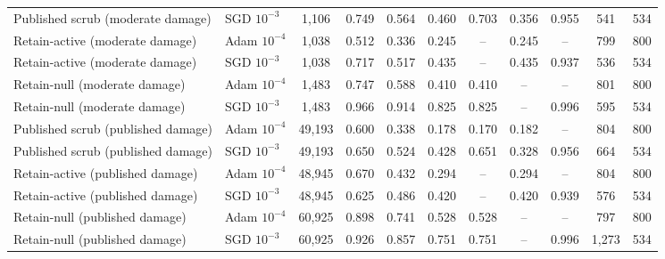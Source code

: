 \begin{tabular}{llccccccccc}
Published scrub (moderate damage) & SGD $10^{-3}$ & 1,106 & 0.749 & 0.564 & 0.460 & 0.703 & 0.356 & 0.955 & 541 & 534 \\
Retain-active (moderate damage) & Adam $10^{-4}$ & 1,038 & 0.512 & 0.336 & 0.245 & -- & 0.245 & -- & 799 & 800 \\
Retain-active (moderate damage) & SGD $10^{-3}$ & 1,038 & 0.717 & 0.517 & 0.435 & -- & 0.435 & 0.937 & 536 & 534 \\
Retain-null (moderate damage) & Adam $10^{-4}$ & 1,483 & 0.747 & 0.588 & 0.410 & 0.410 & -- & -- & 801 & 800 \\
Retain-null (moderate damage) & SGD $10^{-3}$ & 1,483 & 0.966 & 0.914 & 0.825 & 0.825 & -- & 0.996 & 595 & 534 \\
Published scrub (published damage) & Adam $10^{-4}$ & 49,193 & 0.600 & 0.338 & 0.178 & 0.170 & 0.182 & -- & 804 & 800 \\
Published scrub (published damage) & SGD $10^{-3}$ & 49,193 & 0.650 & 0.524 & 0.428 & 0.651 & 0.328 & 0.956 & 664 & 534 \\
Retain-active (published damage) & Adam $10^{-4}$ & 48,945 & 0.670 & 0.432 & 0.294 & -- & 0.294 & -- & 804 & 800 \\
Retain-active (published damage) & SGD $10^{-3}$ & 48,945 & 0.625 & 0.486 & 0.420 & -- & 0.420 & 0.939 & 576 & 534 \\
Retain-null (published damage) & Adam $10^{-4}$ & 60,925 & 0.898 & 0.741 & 0.528 & 0.528 & -- & -- & 797 & 800 \\
Retain-null (published damage) & SGD $10^{-3}$ & 60,925 & 0.926 & 0.857 & 0.751 & 0.751 & -- & 0.996 & 1,273 & 534 \\
\bottomrule
\end{tabular}
